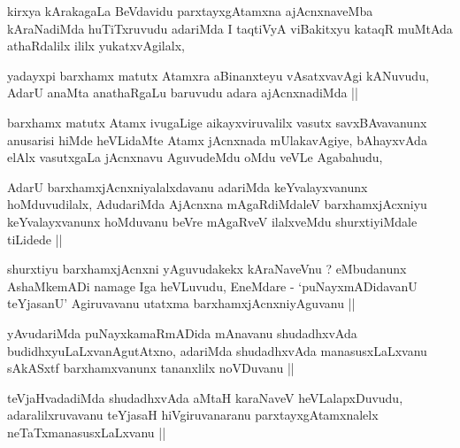 
\begin{artha}
kirxya kArakagaLa BeVdavidu parxtayxgAtamxna ajAcnxnaveMba kAraNadiMda
huTiTxruvudu adariMda I taqtiVyA viBakitxyu kataqR muMtAda athaRdalilx
ililx yukatxvAgilalx, 
\end{artha}

\begin{artha}
yadayxpi barxhamx matutx Atamxra aBinanxteyu vAsatxvavAgi kANuvudu,
AdarU anaMta anathaRgaLu baruvudu adara ajAcnxnadiMda ||
\end{artha}

\begin{artha}
barxhamx matutx Atamx ivugaLige aikayxviruvalilx vasutx savxBAvavanunx
anusarisi hiMde heVLidaMte Atamx jAcnxnada mUlakavAgiye, bAhayxvAda
elAlx vasutxgaLa jAcnxnavu AguvudeMdu oMdu veVLe Agabahudu, 
\end{artha}

\begin{artha}
AdarU barxhamxjAcnxniyalalxdavanu adariMda keYvalayxvanunx
hoMduvudilalx, AdudariMda AjAcnxna mAgaRdiMdaleV barxhamxjAcxniyu
keYvalayxvanunx hoMduvanu beVre mAgaRveV ilalxveMdu shurxtiyiMdale
tiLidede ||
\end{artha}


\begin{artha}
shurxtiyu barxhamxjAcnxni yAguvudakekx kAraNaveVnu ? eMbudanunx
AshaMkemADi namage Iga heVLuvudu, EneMdare  - `puNayxmADidavanU
teYjasanU' Agiruvavanu utatxma barxhamxjAcnxniyAguvanu ||
\end{artha}


\begin{artha}
yAvudariMda puNayxkamaRmADida mAnavanu shudadhxvAda
budidhxyuLaLxvanAgutAtxno, adariMda shudadhxvAda manasusxLaLxvanu
sAkASxtf barxhamxvanunx tananxlilx noVDuvanu ||
\end{artha}


\begin{artha}
teVjaHvadadiMda shudadhxvAda aMtaH karaNaveV heVLalapxDuvudu,
adaralilxruvavanu teYjasaH hiVgiruvanaranu parxtayxgAtamxnalelx
neTaTxmanasusxLaLxvanu ||
\end{artha}

